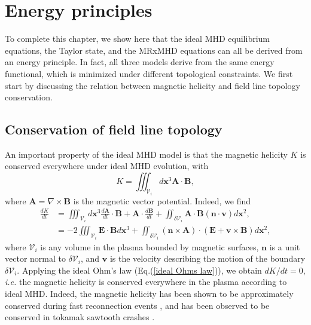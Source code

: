 \documentclass[my_thesis.tex]{subfiles}
\begin{document}
\section{Energy principles}
To complete this chapter, we show here that the ideal MHD equilibrium equations, the Taylor state, and the MRxMHD equations can all be derived from an energy principle. In fact, all three models derive from the same energy functional, which is minimized under different topological constraints. We first start by discussing the relation between magnetic helicity and field line topology conservation.

\subsection{Conservation of field line topology}
An important property of the ideal MHD model is that the magnetic helicity $K$ is conserved everywhere under ideal MHD evolution, with
\begin{equation}
	K = \iiint_{\mathcal{V}_i} d\mathbf{x}^3 \mathbf{A} \cdot \mathbf{B},
\end{equation}
where $\mathbf{A}=\nabla\times\mathbf{B}$ is the magnetic vector potential. Indeed, we find
\begin{align}
	\frac{dK}{dt} &= \iiint_{\mathcal{V}_i} d\mathbf{x}^3 \frac{d\mathbf{A}}{dt}\cdot\mathbf{B} + \mathbf{A}\cdot\frac{d\mathbf{B}}{dt} + \iint_{\delta\mathcal{V}_i} \mathbf{A}\cdot\mathbf{B}(\mathbf{n}\cdot\mathbf{v})d\mathbf{x}^2, \\
	&= -2\iiint_{\mathcal{V}_i}\mathbf{E}\cdot\mathbf{B} d\mathbf{x}^3 + \iint_{\delta\mathcal{V}_i}(\mathbf{n}\times\mathbf{A})\cdot(\mathbf{E}+\mathbf{v}\times\mathbf{B})d\mathbf{x}^2,
\end{align}
where $\mathcal{V}_i$ is any volume in the plasma bounded by magnetic surfaces, $\mathbf{n}$ is a unit vector normal to $\delta \mathcal{V}_i$, and $\mathbf{v}$ is the velocity describing the motion of the boundary $\delta\mathcal{V}_i$. Applying the ideal Ohm's law (Eq.(\ref{ideal Ohms law})), we obtain $dK/dt = 0$, \textit{i.e.} the magnetic helicity is conserved everywhere in the plasma according to ideal MHD. Indeed, the magnetic helicity has been shown to be approximately conserved during fast reconnection events \citep{bergerIntroductionMagneticHelicity1999}, and has been observed to be conserved in tokamak sawtooth crashes \citep{Heidbrink2000}. 
\end{document}
